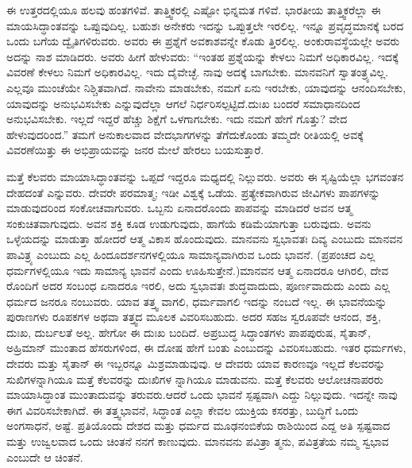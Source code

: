 ಈ ಉತ್ತರದಲ್ಲಿಯೂ ಹಲವು ಹಂತಗಳಿವೆ. ತಾತ್ತ್ವಿಕರಲ್ಲಿ ಎಷ್ಟೋ ಭಿನ್ನಮತ ಗಳಿವೆ. ಭಾರತೀಯ ತಾತ್ತ್ವಿಕರೆಲ್ಲಾ ಈ ಮಾಯಸಿದ್ಧಾಂತವನ್ನು ಒಪ್ಪುವುದಿಲ್ಲ. ಬಹುಶಃ ಅನೇಕರು ಇದನ್ನು ಒಪ್ಪುತ್ತಲೇ ಇರಲಿಲ್ಲ. ಇನ್ನೂ ಪ್ರವೃದ್ಧಮಾನಕ್ಕೆ ಬರದ ಒಂದು ಬಗೆಯ ದ್ವೈತಿಗಳಿರುವರು. ಅವರು ಈ ಪ್ರಶ್ನೆಗೆ ಅವಕಾಶವನ್ನೇ ಕೊಡು ತ್ತಿರಲಿಲ್ಲ. ಅಂಕುರಾವಸ್ಥೆಯಲ್ಲೇ ಅವರು ಅದನ್ನು ನಾಶ ಮಾಡಿದರು. ಅವರು ಹೀಗೆ ಹೇಳುವರು: “ಇಂತಹ ಪ್ರಶ್ನೆಯನ್ನು ಕೇಳಲು ನಿಮಗೆ ಅಧಿಕಾರವಿಲ್ಲ. ಇದಕ್ಕೆ ವಿವರಣೆ ಕೇಳಲು ನಿಮಗೆ ಅಧಿಕಾರವಿಲ್ಲ. ಇದು ದೈವೇಚ್ಛೆ. ನಾವು ಅದಕ್ಕೆ ಬಾಗಬೇಕು. ಮಾನವನಿಗೆ ಸ್ವಾತಂತ್ರ್ಯವಿಲ್ಲ. ಎಲ್ಲವೂ ಮುಂಚೆಯೇ ನಿಶ್ಚಿತವಾಗಿದೆ. ನಾವೇನು ಮಾಡಬೇಕು, ನಮಗೆ ಏನು ಇರಬೇಕು, ಯಾವುದನ್ನು ಆನಂದಿಸಬೇಕು, ಯಾವುದನ್ನು ಅನುಭವಿಸಬೇಕು ಎನ್ನುವುದೆಲ್ಲಾ ಆಗಲೆ ನಿರ್ಧರಿಸಲ್ಪಟ್ಟಿದೆ.ದುಃಖ ಬಂದರೆ ಸಮಾಧಾನದಿಂದ ಅನುಭವಿಸಬೇಕು. ಇಲ್ಲದೆ ಇದ್ದರೆ ಹೆಚ್ಚು ಶಿಕ್ಷೆಗೆ ಒಳಗಾಗಬೇಕು. ಇದು ನಮಗೆ ಹೇಗೆ ಗೊತ್ತು? ವೇದ ಹೇಳುವುದರಿಂದ.” ತಮಗೆ ಅನುಕಾಲವಾದ ವೇದಭಾಗಗಳನ್ನು ತೆಗೆದುಕೊಂಡು ತಮ್ಮದೇ ರೀತಿಯಲ್ಲಿ ಅವಕ್ಕೆ ವಿವರಣೆಯಿತ್ತು ಈ ಅಭಿಪ್ರಾಯವನ್ನು ಜನರ ಮೇಲೆ ಹೇರಲು ಬಯಸುತ್ತಾರೆ.

ಮತ್ತೆ ಕೆಲವರು ಮಾಯಾಸಿದ್ಧಾಂತವನ್ನು ಒಪ್ಪದೆ ಇದ್ದರೂ ಮಧ್ಯದಲ್ಲಿ ನಿಲ್ಲುವರು. ಅವರು ಈ ಸೃಷ್ಟಿಯೆಲ್ಲಾ ಭಗವಂತನ ದೇಹದಂತೆ ಎನ್ನುವರು. ದೇವರೇ ಪರಮಾತ್ಮ; ಇಡೀ ವಿಶ್ವಕ್ಕೆ ಒಡೆಯ. ಪ್ರತ್ಯೇಕವಾಗಿರುವ ಜೀವಿಗಳು ಪಾಪಗಳನ್ನು ಮಾಡುವುದರಿಂದ ಸಂಕೋಚವಾಗುವರು. ಒಬ್ಬನು ಏನಾದರೊಂದು ಪಾಪವನ್ನು ಮಾಡಿದರೆ ಅವನ ಆತ್ಮ ಸಂಕುಚಿತವಾಗುವುದು. ಅವನ ಶಕ್ತಿ ಕೂಡ ಉಡುಗುವುದು, ಹಾಗೆಯೆ ಕಡಿಮೆಯಾಗುತ್ತಾ ಬರುವುದು. ಅವನು ಒಳ್ಳೆಯದನ್ನು ಮಾಡುತ್ತಾ ಹೋದರೆ ಆತ್ಮ ವಿಕಾಸ ಹೊಂದುವುದು. ಮಾನವನು ಸ್ವಭಾವತಃ ದಿವ್ಯ ಎಂಬುದು ಮಾನವನ ಪಾವಿತ್ರ್ಯ ಎಂಬುದು ಎಲ್ಲ ಹಿಂದೂದರ್ಶನಗಳಲ್ಲಿಯೂ ಸಾಮಾನ್ಯವಾಗಿರುವ ಒಂದು ಭಾವನೆ. (ಪ್ರಪಂಚದ ಎಲ್ಲ ಧರ್ಮಗಳಲ್ಲಿಯೂ ಇದು ಸಾಮಾನ್ಯ ಭಾವನೆ ಎಂದು ಊಹಿಸುತ್ತೇನೆ.)ಮಾನವನ ಆತ್ಮ ಏನಾದರೂ ಆಗಿರಲಿ, ದೇವ ರೊಂದಿಗೆ ಅದರ ಸಂಬಂಧ ಏನಾದರೂ ಇರಲಿ, ಅದು ಸ್ವಭಾವತಃ ಶುದ್ಧವಾದುದು, ಪೂರ್ಣವಾದುದು ಎಂದು ಎಲ್ಲ ಧರ್ಮದ ಜನರೂ ನಂಬುವರು. ಯಾವ ತತ್ತ್ವ ವಾಗಲಿ, ಧರ್ಮವಾಗಲಿ ಇದನ್ನು ನಂಬದೆ ಇಲ್ಲ. ಈ ಭಾವನೆಯನ್ನು ಪುರಾಣಗಳು ರೂಪಕಗಳ ಅಥವಾ ತತ್ತ್ವದ ಮೂಲಕ ವಿವರಿಸಬಹುದು. ಅದರ ಸಹಜ ಸ್ವರೂಪವೇ ಆನಂದ, ಶಕ್ತಿ, ದುಃಖ, ದುರ್ಬಲತೆ ಅಲ್ಲ. ಹೇಗೋ ಈ ದುಃಖ ಬಂದಿದೆ. ಅಪ್ರಬುದ್ಧ ಸಿದ್ಧಾಂತಗಳು ಪಾಪಪುರುಷ, ಸೈತಾನ್​, ಅಹ್ರಿಮಾನ್​ ಮುಂತಾದ ಹೆಸರುಗಳಿಂದ, ಈ ದೋಷ ಹೇಗೆ ಬಂತು ಎಂಬುದನ್ನು ವಿವರಿಸಬಹುದು. ಇತರ ಧರ್ಮಗಳು, ದೇವರು ಮತ್ತು ಸೈತಾನ್​ ಈ ಇಬ್ಬರನ್ನೂ ಮಿಶ್ರಮಾಡುವುವು. ಆ ದೇವರು ಯಾವ ಕಾರಣವೂ ಇಲ್ಲದೆ ಕೆಲವರನ್ನು ಸುಖಿಗಳನ್ನಾಗಿಯೂ ಮತ್ತೆ ಕೆಲವರನ್ನು ದುಃಖಿಗಳ ನ್ನಾಗಿಯೂ ಮಾಡುವನು. ಮತ್ತೆ ಕೆಲವರು ಆಲೋಚನಾಪರರು ಮಾಯಾಸಿದ್ಧಾಂತ ಮುಂತಾದುವನ್ನು ತರುವರು.ಆದರೆ ಒಂದು ಭಾವನೆ ಸ್ಪಷ್ಟವಾಗಿ ಎದ್ದು ನಿಲ್ಲುವುದು. ಇದನ್ನೇ ನಾವು ಈಗ ವಿವರಿಸಬೇಕಾಗಿದೆ. ಈ ತತ್ತ್ವಭಾವನೆ, ಸಿದ್ಧಾಂತ ಎಲ್ಲಾ ಕೇವಲ ಯುಕ್ತಿಯ ಕಸರತ್ತು, ಬುದ್ಧಿಗೆ ಒಂದು ಅಂಗಸಾಧನೆ, ಅಷ್ಟೆ. ಪ್ರತಿಯೊಂದು ದೇಶದ ಮತ್ತು ಧರ್ಮದ ಮೂಢನಂಬಿಕೆಯ ರಾಶಿಯಿಂದ ಎದ್ದ ಅತಿ ಸ್ಪಷ್ಟವಾದ ಮತ್ತು ಉಜ್ವಲವಾದ ಒಂದು ಚಿಂತನೆ ನನಗೆ ಕಾಣುವುದು. ಮಾನವನು ಪವಿತ್ರಾ ತ್ಮನು, ಪವಿತ್ರತೆಯ ನಮ್ಮ ಸ್ವಭಾವ ಎಂಬುದೇ ಆ ಚಿಂತನೆ.

